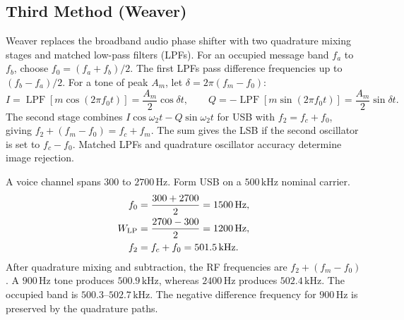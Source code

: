 \documentclass[12pt,a4paper]{article}
\begin{document}
\subsection{Third Method (Weaver)}
Weaver replaces the broadband audio phase shifter with two quadrature mixing stages and matched low-pass filters (LPFs). For an occupied message band $f_a$ to $f_b$, choose $f_0=(f_a+f_b)/2$. The first LPFs pass difference frequencies up to $(f_b-f_a)/2$. For a tone of peak $A_m$, let $\delta=2\pi(f_m-f_0)$:
\[
 I=\operatorname{LPF}[m\cos(2\pi f_0t)]
   =\frac{A_m}{2}\cos\delta t,\qquad
 Q=-\operatorname{LPF}[m\sin(2\pi f_0t)]
   =\frac{A_m}{2}\sin\delta t.
\]
The second stage combines $I\cos\omega_2t-Q\sin\omega_2t$ for USB with $f_2=f_c+f_0$, giving $f_2+(f_m-f_0)=f_c+f_m$. The sum gives the LSB if the second oscillator is set to $f_c-f_0$. Matched LPFs and quadrature oscillator accuracy determine image rejection.

\begin{tcolorbox}[tikzbox, unbreakable, title={Weaver Upper Sideband Signal Paths}]
\centering
{}\par
\end{tcolorbox}

\begin{tcolorbox}[examplebox, title={Weaver Frequency Plan for a Speech Channel}]
A voice channel spans $300$ to $2700\,\mathrm{Hz}$. Form USB on a $500\,\mathrm{kHz}$ nominal carrier.
\[
\begin{aligned}
 f_0&=\frac{300+2700}{2}=1500\,\mathrm{Hz},\\
 W_{\rm LP}&=\frac{2700-300}{2}=1200\,\mathrm{Hz},\\
 f_2&=f_c+f_0=501.5\,\mathrm{kHz}.
\end{aligned}
\]
After quadrature mixing and subtraction, the RF frequencies are $f_2+(f_m-f_0)$. A $900\,\mathrm{Hz}$ tone produces $500.9\,\mathrm{kHz}$, whereas $2400\,\mathrm{Hz}$ produces $502.4\,\mathrm{kHz}$. The occupied band is $500.3$--$502.7\,\mathrm{kHz}$. The negative difference frequency for $900\,\mathrm{Hz}$ is preserved by the quadrature paths.
\end{tcolorbox}
\end{document}
